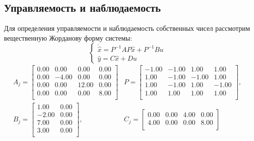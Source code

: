 \subsection{Управляемость и наблюдаемость}
Для определения управляемости и наблюдаемость собственных чисел рассмотрим вещественную Жорданову форму системы:
\begin{equation}
    \begin{cases}
        \dot{\hat{x}} = P^{-1}AP\hat{x} + P^{-1}Bu \\
        \hat{y} = C\hat{x} + Du
    \end{cases}
\end{equation}
\begin{equation}
    \begin{array}{cccc}
        A_j = \begin{bmatrix}
            0.00  & 0.00  & 0.00  & 0.00 \\ 
            0.00  & -4.00  & 0.00  & 0.00 \\ 
            0.00  & 0.00  & 12.00  & 0.00 \\ 
            0.00  & 0.00  & 0.00  & 8.00 \\ 
            \end{bmatrix} &
        P = \begin{bmatrix}
            -1.00  & -1.00  & 1.00  & 1.00 \\ 
            1.00  & -1.00  & -1.00  & 1.00 \\ 
            1.00  & -1.00  & 1.00  & -1.00 \\ 
            1.00  & 1.00  & 1.00  & 1.00 \\ 
            \end{bmatrix}, \\
        B_j = \begin{bmatrix}
            1.00  & 0.00 \\ 
            -2.00  & 0.00 \\ 
            7.00  & 0.00 \\ 
            3.00  & 0.00 \\
            \end{bmatrix}, & 
        C_j = \begin{bmatrix}
            0.00  & 0.00  & 4.00  & 0.00 \\ 
            4.00  & 0.00  & 0.00  & 8.00 \\ 
        \end{bmatrix}
    \end{array}
\end{equation}

